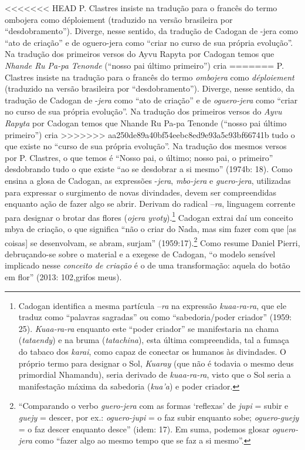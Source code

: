 {{<<<<<<< HEAD
P. Clastres insiste na tradução para o francês do termo ombojera como
déploiement (traduzido na versão brasileira por ``desdobramento'').
Diverge, nesse sentido, da tradução de Cadogan de -jera como ``ato de
criação'' e de oguero-jera como ``criar no curso de sua própria
evolução''. Na tradução dos primeiros versos do Ayvu Rapyta por Cadogan
temos que \emph{Nhande Ru Pa-pa Tenonde} (``nosso pai último primeiro'') cria
=======
P. Clastres insiste na tradução para o francês do termo \emph{ombojera} como
\emph{déploiement} (traduzido na versão brasileira por ``desdobramento'').
Diverge, nesse sentido, da tradução de Cadogan de -\emph{jera} como ``ato de
criação'' e de \emph{oguero-jera} como ``criar no curso de sua própria
evolução''. Na tradução dos primeiros versos do \emph{Ayvu Rapyta} por Cadogan
temos que Nhande Ru Pa-pa Tenonde (``nosso pai último primeiro'') cria
>>>>>>> aa250de89a40bf54eebc8ed9e93a5c93bf66741b
tudo o que existe no ``curso de sua própria evolução''. Na tradução dos
mesmos versos por P. Clastres, o que temos é ``Nosso pai, o último;
nosso pai, o primeiro'' desdobrando tudo o que existe ``ao se desdobrar a
si mesmo'' (1974b: 18). Como ensina a glosa de Cadogan, as expressões
-\emph{jera}, \emph{mbo-jera} e \emph{guero-jera}, utilizadas para expressar o surgimento de
novas divindades, devem ser compreendidas enquanto ação de fazer algo
se abrir. Derivam do radical --\emph{ra}, linguagem corrente para designar o
brotar das flores (\emph{ojera yvoty}).\footnote{Cadogan identifica a mesma
partícula --\emph{ra} na expressão \emph{kuaa-ra-ra}, que ele traduz como ``palavras
sagradas'' ou como ``sabedoria/poder criador'' (1959: 25). \emph{Kuaa-ra-ra}
enquanto este ``poder criador'' se manifestaria na chama (\emph{tataendy}) e na
bruma (\emph{tatachina}), esta última compreendida, tal a fumaça do tabaco dos
\emph{karai}, como capaz de conectar os humanos às divindades. O próprio termo
para designar o Sol, \emph{Kuaray} (que não é todavia o mesmo deus primordial
Nhamandu), seria derivado de \emph{kuaa-ra-ra}, visto que o Sol seria a
manifestação máxima da sabedoria (\emph{kua’a}) e poder criador.  } Cadogan
extrai daí um conceito mbya de criação, o que significa ``não o criar do
Nada, mas sim fazer com que [as coisas] se desenvolvam, se abram,
surjam'' (1959:17).\footnote{``Comparando o verbo \emph{guero-jera} com as
formas ‘reflexas’ de \emph{jupi} = subir e \emph{guejy} = descer, por ex.:
\emph{oguero-jupi} = o faz subir enquanto sobe; \emph{oguero-guejy} = o faz descer
enquanto desce'' (idem: 17). Em suma, podemos glosar \emph{oguero-jera} como
``fazer algo ao mesmo tempo que se faz a si mesmo''.} Como resume Daniel
Pierri, debruçando-se sobre o material e a exegese de Cadogan, ``o
modelo sensível implicado nesse \emph{conceito de criação} é o de uma
transformação: aquela do botão em flor'' (2013: 102,grifos meus). 

}}
